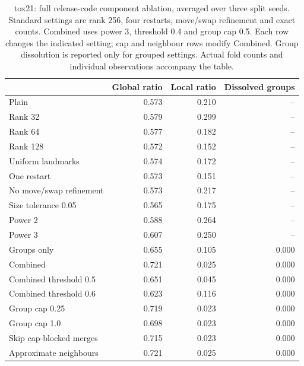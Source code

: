 \begin{table}[htbp]\centering\small
\begin{tabular}{lrrr}
\toprule
 & Global ratio & Local ratio & Dissolved groups \\
\midrule
Plain & 0.573 & 0.210 & -- \\
Rank 32 & 0.579 & 0.299 & -- \\
Rank 64 & 0.577 & 0.182 & -- \\
Rank 128 & 0.572 & 0.152 & -- \\
Uniform landmarks & 0.574 & 0.172 & -- \\
One restart & 0.573 & 0.151 & -- \\
No move/swap refinement & 0.573 & 0.217 & -- \\
Size tolerance 0.05 & 0.565 & 0.175 & -- \\
Power 2 & 0.588 & 0.264 & -- \\
Power 3 & 0.607 & 0.250 & -- \\
Groups only & 0.655 & 0.105 & 0.000 \\
Combined & 0.721 & 0.025 & 0.000 \\
Combined threshold 0.5 & 0.651 & 0.045 & 0.000 \\
Combined threshold 0.6 & 0.623 & 0.116 & 0.000 \\
Group cap 0.25 & 0.719 & 0.023 & 0.000 \\
Group cap 1.0 & 0.698 & 0.023 & 0.000 \\
Skip cap-blocked merges & 0.715 & 0.023 & 0.000 \\
Approximate neighbours & 0.721 & 0.025 & 0.000 \\
\bottomrule
\end{tabular}

\caption{tox21: full release-code component ablation, averaged over three split seeds. Standard settings are rank 256, four restarts, move/swap refinement and exact counts. Combined uses power 3, threshold 0.4 and group cap 0.5. Each row changes the indicated setting; cap and neighbour rows modify Combined. Group dissolution is reported only for grouped settings. Actual fold counts and individual observations accompany the table.}\end{table}
